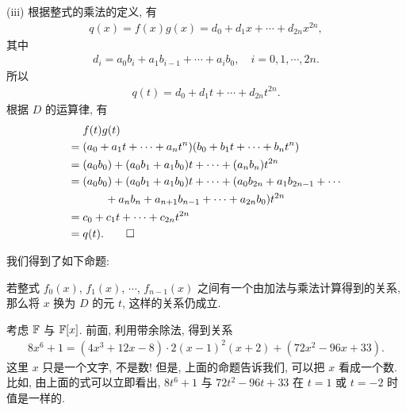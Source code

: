 \begin{pf}
    (iii) 根据整式的乘法的定义, 有
    \begin{align*}
        q(x) = f(x) g(x) = d_0 + d_1 x + \cdots + d_{2n} x^{2n},
    \end{align*}
    其中
    \begin{align*}
        d_i = a_0 b_i + a_1 b_{i-1} + \cdots + a_i b_0, \quad i = 0,1,\cdots,2n.
    \end{align*}
    所以
    \begin{align*}
        q(t) = d_0 + d_1 t + \cdots + d_{2n} t^{2n}.
    \end{align*}
    根据 $D$ 的运算律, 有
    \begin{align*}
             & f(t) g(t)                                                                        \\
        = {} & (a_0 + a_1 t + \cdots + a_n t^n) (b_0 + b_1 t + \cdots + b_n t^n)                \\
        = {} & (a_0 b_0) + (a_0 b_1 + a_1 b_0) t + \cdots + (a_n b_n) t^{2n}                    \\
        = {} & (a_0 b_0) + (a_0 b_1 + a_1 b_0) t + \cdots + (a_0 b_{2n} + a_1 b_{2n-1} + \cdots \\
             & \qquad + a_n b_n + a_{n+1} b_{n-1} + \cdots + a_{2n} b_0) t^{2n}                 \\
        = {} & c_0 + c_1 t + \cdots + c_{2n} t^{2n}                                             \\
        = {} & q(t). \qedhere
    \end{align*}
\end{pf}

我们得到了如下命题:
\begin{proposition}
    若整式 $f_0 (x)$, $f_1 (x)$, $\cdots$, $f_{n-1} (x)$ 之间有一个由加法与乘法计算得到的关系, 那么将 $x$ 换为 $D$ 的元 $t$, 这样的关系仍成立.
\end{proposition}

\begin{example}
    考虑 $\mathbb{F}$ 与 $\mathbb{F}[x]$. 前面, 利用带余除法, 得到关系
    \begin{align*}
        8x^6 + 1 = (4x^3 + 12x - 8) \cdot 2(x-1)^2 (x+2) + (72x^2 - 96x + 33).
    \end{align*}
    这里 $x$ 只是一个文字, 不是数! 但是, 上面的命题告诉我们, 可以把 $x$ 看成一个数. 比如, 由上面的式可以立即看出, $8t^6 + 1$ 与 $72t^2 - 96t + 33$ 在 $t = 1$ 或 $t = -2$ 时值是一样的.
\end{example}

